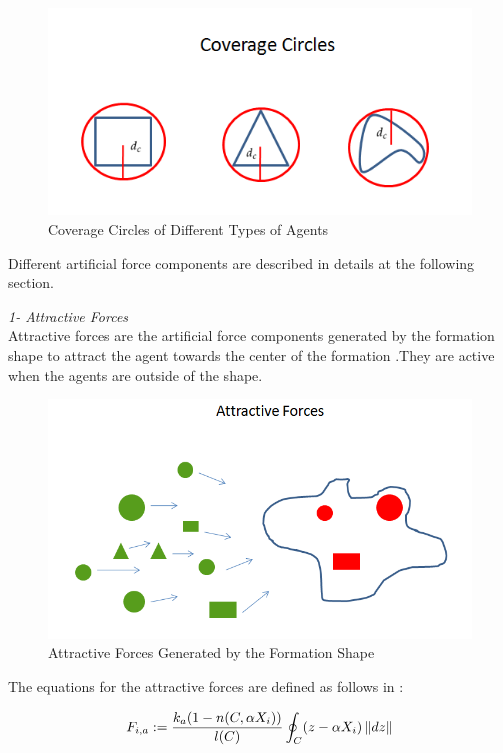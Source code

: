 \begin{figure}[H]
\caption{Coverage Circles of Different Types of Agents} \label{coverage_circle_ref}
\centering
\includegraphics[scale = 0.60]{coverage_circles}
\end{figure}
		
Different artificial force components are described in details at the following section. \newline

\textit{			1- Attractive Forces} \\ 
Attractive forces are the artificial force components generated by the formation shape to attract the agent towards the center of the formation .They are active when the agents are outside of the shape. 

\begin{figure}[H]
\caption{Attractive Forces Generated by the Formation Shape}
\centering
\includegraphics[scale = 0.60]{attractive_forces}
\end{figure}	

The equations for the attractive forces are defined as follows in \cite{17}:			

\begin{equation} \label{samitha_attractive}
F_{i,a} := \frac{k_a (1-n(C,\alpha X_i))}{l(C)} \oint_C(z-\alpha X_i)\left\lVert dz\right\rVert
\end{equation}

